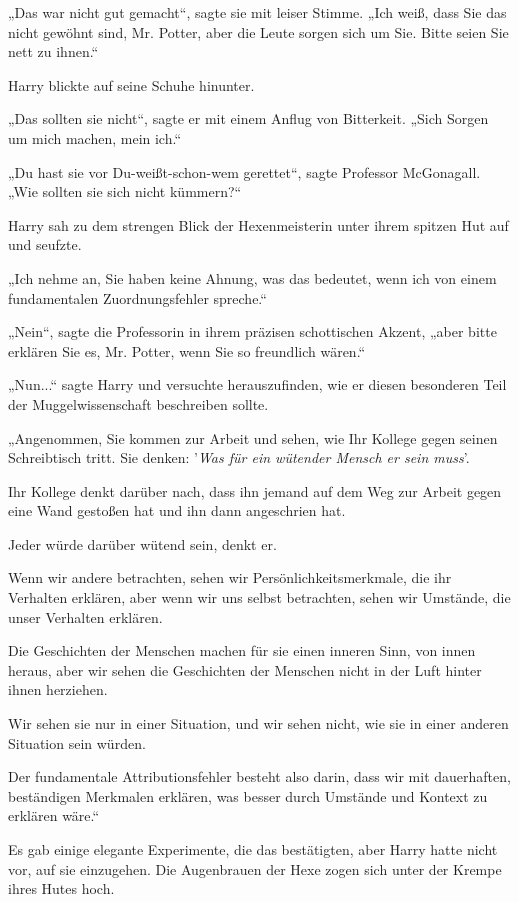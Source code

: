 {„Das war nicht gut gemacht“, sagte sie mit leiser Stimme. „Ich weiß, dass Sie das nicht gewöhnt sind, Mr. Potter, aber die Leute sorgen sich um Sie. Bitte seien Sie nett zu ihnen.“

Harry blickte auf seine Schuhe hinunter.

„Das sollten sie nicht“, sagte er mit einem Anflug von Bitterkeit. „Sich Sorgen um mich machen, mein ich.“

„Du hast sie vor Du-weißt-schon-wem gerettet“, sagte Professor McGonagall. „Wie sollten sie sich nicht kümmern?“

Harry sah zu dem strengen Blick der Hexenmeisterin unter ihrem spitzen Hut auf und seufzte.

„Ich nehme an, Sie haben keine Ahnung, was das bedeutet, wenn ich von einem fundamentalen Zuordnungsfehler spreche.“

„Nein“, sagte die Professorin in ihrem präzisen schottischen Akzent, „aber bitte erklären Sie es, Mr. Potter, wenn Sie so freundlich wären.“

„Nun...“ sagte Harry und versuchte herauszufinden, wie er diesen besonderen Teil der Muggelwissenschaft beschreiben sollte.

„Angenommen, Sie kommen zur Arbeit und sehen, wie Ihr Kollege gegen seinen Schreibtisch tritt. Sie denken: '\emph{Was für ein wütender Mensch er sein muss}'.

Ihr Kollege denkt darüber nach, dass ihn jemand auf dem Weg zur Arbeit gegen eine Wand gestoßen hat und ihn dann angeschrien hat.

Jeder würde darüber wütend sein, denkt er.

Wenn wir andere betrachten, sehen wir Persönlichkeitsmerkmale, die ihr Verhalten erklären, aber wenn wir uns selbst betrachten, sehen wir Umstände, die unser Verhalten erklären.

Die Geschichten der Menschen machen für sie einen inneren Sinn, von innen heraus, aber wir sehen die Geschichten der Menschen nicht in der Luft hinter ihnen herziehen.

Wir sehen sie nur in einer Situation, und wir sehen nicht, wie sie in einer anderen Situation sein würden.

Der fundamentale Attributionsfehler besteht also darin, dass wir mit dauerhaften, beständigen Merkmalen erklären, was besser durch Umstände und Kontext zu erklären wäre.“

Es gab einige elegante Experimente, die das bestätigten, aber Harry hatte nicht vor, auf sie einzugehen. Die Augenbrauen der Hexe zogen sich unter der Krempe ihres Hutes hoch.

}
